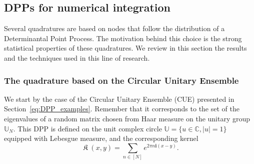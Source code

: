 \documentclass[twoside,11pt]{book}
\newtheorem{proposition}{Proposition}
\newtheorem{definition}{Definition}
\numberwithin{theorem}{chapter}
\numberwithin{definition}{chapter}
\numberwithin{proposition}{chapter}
\numberwithin{corollary}{chapter}
\numberwithin{example}{chapter}
\numberwithin{lemma}{chapter}
\DeclareMathOperator*{\KDPP}{\mathfrak{K}}
\begin{document}











\subsection{DPPs for numerical integration}
Several quadratures are based on nodes that follow the distribution of a Determinantal Point Process. The motivation behind this choice is the strong statistical properties of these quadratures. We review in this section the results and the techniques used in this line of research. 

\subsubsection{The quadrature based on the Circular Unitary Ensemble}
We start by the case of the Circular Unitary Ensemble (CUE) presented in Section~\ref{eq:DPP_examples}. Remember that it corresponds to the set of the eigenvalues of a random matrix chosen from Haar measure on the unitary group $\mathbb{U}_{N}$. This DPP is defined on the unit complex circle $\mathbb{U} = \{ u \in \mathbb{C}, |u| =1 \}$ equipped with Lebesgue measure, and the corresponding kernel
\begin{equation}
\KDPP(x,y) = \sum\limits_{n \in [N]} e^{2 \pi n \mathbf{i}(x-y)}.
\end{equation}  
\end{document}
